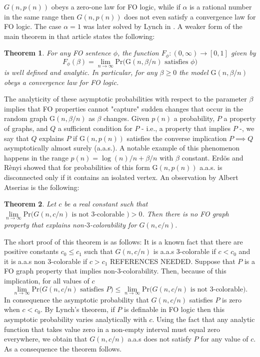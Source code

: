 \documentclass[12pt,notitlepage,a4paper]{article}
\newtheorem{theorem}{Theorem}[section]
\theoremstyle{definition}
\newcommand{\Ln}{\lim\limits_{n\to \infty}}
\begin{document}
$G(n,p(n))$ obeys a zero-one law for FO logic, while if $\alpha$
is a rational number in the same range then $G(n,p(n))$ does not
even satisfy a convergence law for FO logic. The case $\alpha=1$
was later solved by Lynch in \cite{lynch1992probabilities}. A weaker
form of the main theorem in that article states the following:
\begin{theorem} 
	For any FO sentence $\phi$, the function
	$F_\phi: (0,\infty)\rightarrow [0,1]$ given by 
	\[ F_\phi(\beta) = \Ln \mathrm{Pr}\big( \mathrm{G}(n,\beta/n)
	\text{ satisfies } \phi   \big) \]
	is well defined and analytic. In particular, for any
	$\beta \geq 0$ the model $\mathrm{G}(n,\beta/n)$
	obeys a convergence law for FO logic. 
\end{theorem}

The analyticity of these asymptotic probabilities with respect to 
the parameter $\beta$ implies that FO properties cannot "capture" sudden
changes that occur in the random graph $\mathrm{G}(n,\beta/n)$
as $\beta$ changes. Given $p(n)$ a probability, $P$ a property of graphs,
and $Q$ a sufficient condition for $P$ - i.e., a property that 
implies $P$ -, we say that $Q$ explains $P$ if $\mathrm{G}(n,p(n))$ satisfies 
the converse implication $P \implies Q$ asymptotically almost surely
(a.a.s.). A notable example of this phenomenon happens in the range 
$p(n)= \log(n)/n + \beta/n$ with $\beta$ constant. Erd\"os and R\`enyi
\cite{erdHos1960evolution} 
showed that for probabilities of this form $\mathrm{G}(n,p(n))$ 
a.a.s. is disconnected only if it contains an isolated vertex. 
An observation by Albert Atserias is the following:

\begin{theorem}
Let $c$ be a real constant such that 
$\Ln \mathrm{Pr}\big( G(n, c/n) 
\text{ is not }	3\text{-colorable }\big)> 0$.  
Then there is no FO graph property that explains 
non-$3$-colorability for $G(n, c/n)$.
\end{theorem}

The short proof of this theorem is as follows: 
It is a known fact that there are positive constants
$c_0\leq c_1$ such that $G(n, c/n)$ is a.a.s $3$-colorable
if $c<c_0$ and it is a.a.s non $3$-colorable if $c>c_1$ 
REFERENCES NEEDED.
Suppose that $P$ is a FO graph property that implies
non-$3$-colorability. Then, because of this implication,
for all values of $c$
\[\Ln \mathrm{Pr}\big( G(n, c/n) 
\text{ satisfies } P \big) \leq \Ln \mathrm{Pr}\big( G(n, c/n) 
\text{ is not }	3\text{-colorable}\big).\]
In consequence the asymptotic probability that $G(n,c/n)$ 
satisfies $P$ is zero when $c<c_0$. By Lynch's theorem, if 
$P$ is definable in FO logic then this asymptotic probability
varies analytically with $c$. Using the fact that any analytic 
function that takes value zero in a non-empty interval must 
equal zero everywhere, we obtain that $G(n,c/n)$ a.a.s does 
not satisfy $P$ for any value of $c$. 
As a consequence the theorem follows.  \par
\end{document}
